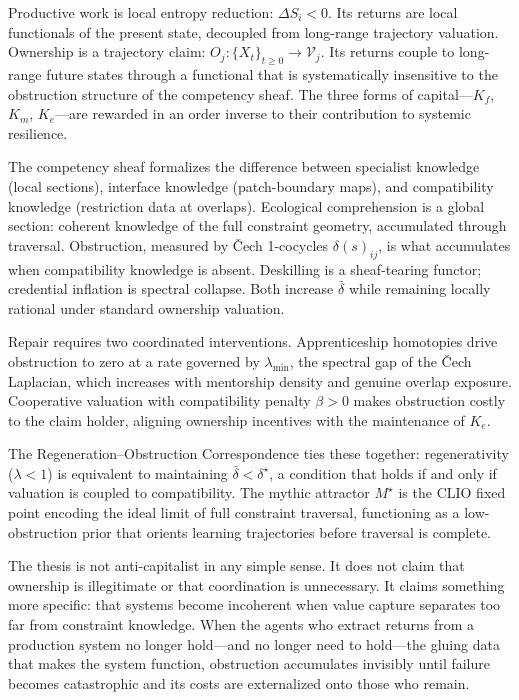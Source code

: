 \documentclass[12pt]{article}
\begin{document}
Productive work is local entropy reduction: $\Delta S_i < 0$. Its returns are local functionals of the present state, decoupled from long-range trajectory valuation. Ownership is a trajectory claim: $O_j: \{X_t\}_{t \ge 0} \to \mathcal{V}_j$. Its returns couple to long-range future states through a functional that is systematically insensitive to the obstruction structure of the competency sheaf. The three forms of capital---$K_f$, $K_m$, $K_e$---are rewarded in an order inverse to their contribution to systemic resilience.

The competency sheaf formalizes the difference between specialist knowledge (local sections), interface knowledge (patch-boundary maps), and compatibility knowledge (restriction data at overlaps). Ecological comprehension is a global section: coherent knowledge of the full constraint geometry, accumulated through traversal. Obstruction, measured by Čech 1-cocycles $\delta(s)_{ij}$, is what accumulates when compatibility knowledge is absent. Deskilling is a sheaf-tearing functor; credential inflation is spectral collapse. Both increase $\bar{\delta}$ while remaining locally rational under standard ownership valuation.

Repair requires two coordinated interventions. Apprenticeship homotopies drive obstruction to zero at a rate governed by $\lambda_{\min}$, the spectral gap of the Čech Laplacian, which increases with mentorship density and genuine overlap exposure. Cooperative valuation with compatibility penalty $\beta > 0$ makes obstruction costly to the claim holder, aligning ownership incentives with the maintenance of $K_e$.

The Regeneration--Obstruction Correspondence ties these together: regenerativity ($\lambda < 1$) is equivalent to maintaining $\bar{\delta} < \delta^\star$, a condition that holds if and only if valuation is coupled to compatibility. The mythic attractor $M^\star$ is the CLIO fixed point encoding the ideal limit of full constraint traversal, functioning as a low-obstruction prior that orients learning trajectories before traversal is complete.

The thesis is not anti-capitalist in any simple sense. It does not claim that ownership is illegitimate or that coordination is unnecessary. It claims something more specific: that systems become incoherent when value capture separates too far from constraint knowledge. When the agents who extract returns from a production system no longer hold---and no longer need to hold---the gluing data that makes the system function, obstruction accumulates invisibly until failure becomes catastrophic and its costs are externalized onto those who remain.
\end{document}
